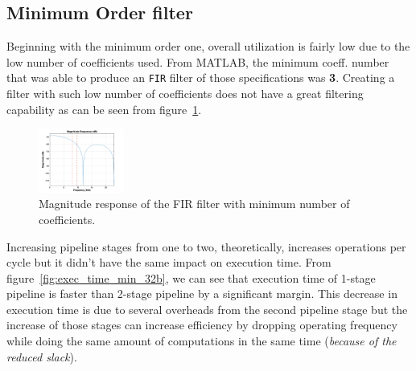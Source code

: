 \subsection{Minimum Order filter}
Beginning with the minimum order one, overall utilization is fairly low due to the low number of coefficients used. From MATLAB, the minimum coeff.\hspace{-3pt} number that was able to produce an \verb|FIR| filter of those specifications was \textbf{3}.
Creating a filter with such low number of coefficients does not have a great filtering capability as can be seen from figure~\ref{fig:min_order_filt}.

\begin{figure}
	\centering
	\includegraphics[width=0.25\textwidth]{../Images/FIR_min_Order/min_order_filt.png}
	\caption{Magnitude response of the FIR filter with minimum number of coefficients.}
	\label{fig:min_order_filt}
\end{figure}

Increasing pipeline stages from one to two, theoretically, increases operations per cycle but it didn't have the same impact on execution time.
From figure~\ref{fig:exec_time_min_32b}, we can see that execution time of 1-stage pipeline is faster than 2-stage pipeline by a significant margin. This decrease in execution time is due to several overheads from the second pipeline stage but the increase of those stages can increase efficiency by dropping operating frequency while doing the same amount of computations in the same time (\textit{because of the reduced slack}).

%

